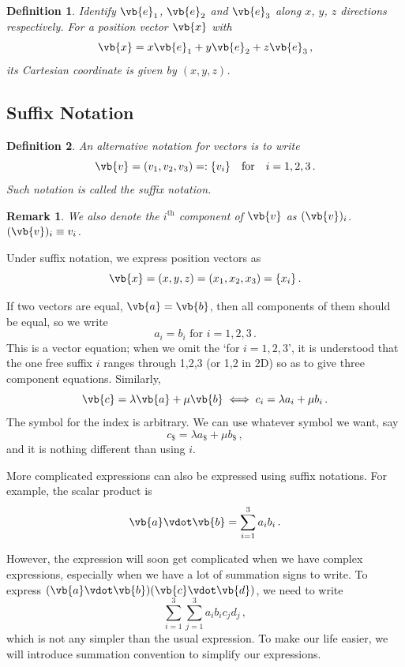\documentclass{article}
\theoremstyle{plain}\theoremheaderfont{\normalfont\itshape}\theorembodyfont{\rmfamily}\theoremseparator{.}\newtheorem*{rem}{Remark}\newtheorem*{ex}{Example}\newtheorem*{proof}{Proof}\newtheorem*{altp}{Alternative proof}
\theoremstyle{plain}\theoremheaderfont{\normalfont\bfseries}\theorembodyfont{\rmfamily}\theoremseparator{.}\newtheorem{thm}{Theorem}[section]\newtheorem{lem}[thm]{Lemma}\newtheorem{prop}[thm]{Proposition}\newtheorem*{cor}{Corollary}\newtheorem{defn}[thm]{Definition}\newtheorem{clm}[thm]{Claim}\newtheorem{clminproof}{Claim}
\theoremstyle{break}\theoremheaderfont{\normalfont\itshape}\theorembodyfont{\rmfamily}\theoremseparator{.\medskip}\newtheorem*{proofskip}{Proof}\newtheorem*{exs}{Examples}\newtheorem*{rems}{Remarks}
\theoremstyle{break}\theoremheaderfont{\normalfont\bfseries}\theorembodyfont{\rmfamily}\theoremseparator{.\medskip}\newtheorem{lemskip}[thm]{Lemma}\newtheorem{defnskip}[thm]{Definition}\newtheorem{propskip}[thm]{Proposition}\newtheorem{thmskip}[thm]{Theorem}
\numberwithin{equation}{section}
\begin{document}
	\begin{defn}
		Identify \(\vb{e}_1\), \(\vb{e}_2\) and \(\vb{e}_3\) along \(x\), \(y\), \(z\) directions respectively. For a position vector \(\vb{x}\) with
		\[\vb{x}=x\vb{e}_1+y\vb{e}_2+z\vb{e}_3\,,\]
		its \textit{Cartesian coordinate} is given by \((x,y,z)\).
	\end{defn}
	
	\subsection{Suffix Notation}
	\begin{defn}
		An alternative notation for vectors is to write
		\[\vb{v}=(v_1,v_2,v_3)=:\{ v_i\}\quad\text{for}\quad i=1,2,3\,.\]
		Such notation is called the \textit{suffix notation}.
	\end{defn}
	\begin{rem}
		We also denote the \(i^\text{th}\) component of \(\vb{v}\) as \((\vb{v})_i\). \((\vb{v})_i\equiv v_i\).
	\end{rem}

	Under suffix notation, we express position vectors as
	\[\vb{x}=(x,y,z)=(x_1,x_2,x_3)=\{x_i\}\,.\]

	If two vectors are equal, \(\vb{a}=\vb{b}\), then all components of them should be equal, so we write
	\[a_i=b_i\text{ for }i=1,2,3\,.\]
	This is a vector equation; when we omit the `for \(i = 1,2,3\)', it is understood that the one free suffix \(i\) ranges through 1,2,3 (or 1,2 in 2D) so as to give three component equations. Similarly,
	\[\vb{c}=\lambda\vb{a}+\mu\vb{b} \iff c_i=\lambda a_i+\mu b_i\,.\]
	The symbol for the index is arbitrary. We can use whatever symbol we want, say
	\[c_{\mathdollar}=\lambda a_{\mathdollar}+\mu b_{\mathdollar}\,,\]
	and it is nothing different than using \(i\).

	More complicated expressions can also be expressed using suffix notations. For example, the scalar product is
	\[\vb{a}\vdot\vb{b}=\sum_{i=1}^{3}a_i b_i\,.\]

	However, the expression will soon get complicated when we have complex expressions, especially when we have a lot of summation signs to write. To express \((\vb{a}\vdot\vb{b})(\vb{c}\vdot\vb{d})\), we need to write
	\[\sum_{i=1}^{3}\sum_{j=1}^{3}a_ib_ic_jd_j\,,\]
	which is not any simpler than the usual expression.	To make our life easier, we will introduce summation convention to simplify our expressions.
	
\end{document}
